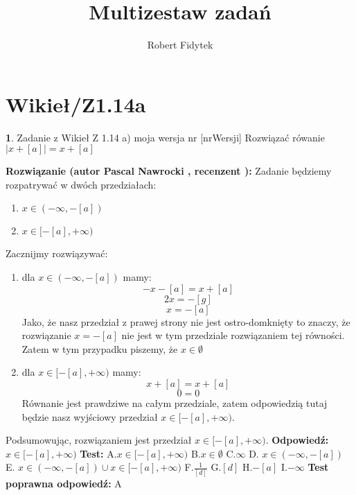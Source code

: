 \documentclass[12pt, a4paper]{article}
\title{Multizestaw zadań}
\author{Robert Fidytek}
\date{}
\theoremstyle{definition} %
\newtheorem{zad}{}
\newcommand{\kategoria}[1]{\section{#1}} %
\newcommand{\zadStart}[1]{\begin{zad}#1\newline} %
\newcommand{\zadStop}{\end{zad}}   %
\newcommand{\rozwStart}[2]{\noindent \textbf{Rozwiązanie (autor #1 , recenzent #2): }\newline} %
\newcommand{\rozwStop}{\newline}                                            %
\newcommand{\odpStart}{\noindent \textbf{Odpowiedź:}\newline}    %
\newcommand{\odpStop}{\newline}                                             %
\newcommand{\testStart}{\noindent \textbf{Test:}\newline} %
\newcommand{\testStop}{\newline} %
\newcommand{\kluczStart}{\noindent \textbf{Test poprawna odpowiedź:}\newline} %
\newcommand{\kluczStop}{\newline} %
\begin{document}
\maketitle



\kategoria{Wikieł/Z1.14a}
\zadStart{Zadanie z Wikieł Z 1.14 a) moja wersja nr [nrWersji]}
Rozwiązać rówanie $|x+[a]|=x+[a]$
\zadStop
\rozwStart{Pascal Nawrocki}{}
Zadanie będziemy rozpatrywać w dwóch przedziałach:
\begin{enumerate}
\item $x\in (-\infty,-[a])$
\item $x\in[-[a],+\infty)$
\end{enumerate}
Zacznijmy rozwiązywać:
\begin{enumerate}
\item dla $x\in (-\infty,-[a])$ mamy:
$$-x-[a]=x+[a]$$
$$2x=-[g]$$
$$x=-[a]$$
Jako, że nasz przedział z prawej strony nie jest ostro-domknięty to znaczy, że rozwiązanie $x=-[a]$ nie jest w tym przedziale rozwiązaniem tej równości. Zatem w tym przypadku piszemy, że $x\in \emptyset$
\item dla $x\in[-[a],+\infty)$ mamy:
$$x+[a]=x+[a]$$
$$0=0$$
Równanie jest prawdziwe na całym przedziale, zatem odpowiedzią tutaj będzie nasz wyjściowy przedział $x\in[-[a],+\infty)$.
\end{enumerate}
Podsumowując, rozwiązaniem jest przedział $x\in[-[a],+\infty)$.
\rozwStop
\odpStart
$x\in[-[a],+\infty)$
\odpStop
\testStart
A.$x\in[-[a],+\infty)$
B.$x\in \emptyset$
C.$\infty$
D. $x\in (-\infty,-[a])$
E. $x\in (-\infty,-[a])\cup x\in[-[a],+\infty)$
F.$\frac{1}{[d]}$
G.$[d]$
H.$-[a]$
I.$-\infty$
\testStop
\kluczStart
A
\kluczStop
\end{document}
